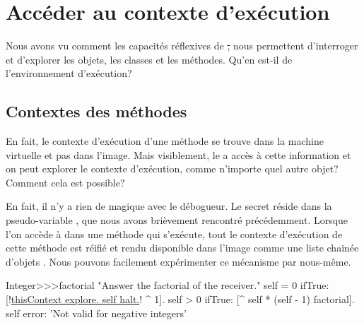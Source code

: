 \documentclass[a4paper,10pt,twoside]{book}
\begin{document}

\section{Accéder au contexte d'exécution}

Nous avons vu comment les capacités réflexives de \st, nous permettent d'interroger et d'explorer les objets, les classes et les méthodes. Qu'en est-il de l'environnement d'exécution?

\subsection{Contextes des méthodes}

En fait, le contexte d'exécution d'une méthode se trouve dans la machine virtuelle et pas dans l'image. Mais visiblement, le  a accès à cette information et on peut explorer le contexte d'exécution, comme n'importe quel autre objet? Comment cela est possible?

En fait, il n'y a rien de magique avec le débogueur.
Le secret réside dans la pseudo-variable , que nous avons brièvement rencontré précédemment.
Lorsque l'on accède à  dans une méthode qui s'exécute, tout le contexte d'exécution de cette méthode est réifié et rendu disponible dans l'image comme une liste chainée d'objets .
Nous pouvons facilement expérimenter ce mécanisme par nous-même.

\begin{code}{}
Integer>>>factorial
	"Answer the factorial of the receiver."
	self = 0 ifTrue: [!\underline{thisContext explore. self halt.}! ^ 1].
	self > 0 ifTrue: [^ self * (self - 1) factorial].
	self error: 'Not valid for negative integers'
\end{code}

\end{document}
